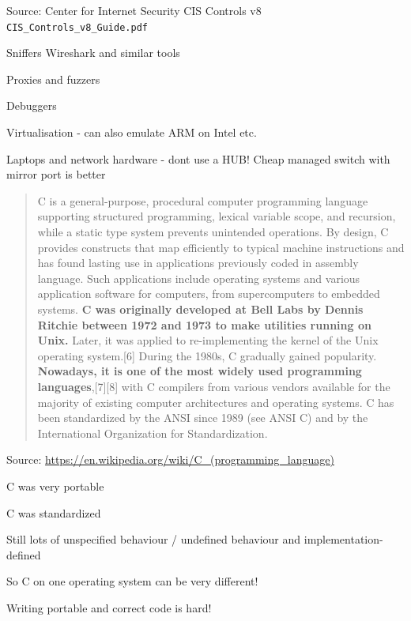\documentclass[Screen16to9,17pt]{foils}
\begin{document}
Source: Center for Internet Security CIS Controls v8 \verb+CIS_Controls_v8_Guide.pdf+






\begin{list2}
\item Sniffers Wireshark and similar tools
\item Proxies and fuzzers
\item Debuggers
\item Virtualisation - can also emulate ARM on Intel etc.
\item Laptops and network hardware - dont use a HUB! Cheap managed switch with mirror port is better
\end{list2}




\begin{quote}
C is a general-purpose, procedural computer programming language supporting structured programming, lexical variable scope, and recursion, while a static type system prevents unintended operations. By design, C provides constructs that map efficiently to typical machine instructions and has found lasting use in applications previously coded in assembly language. Such applications include operating systems and various application software for computers, from supercomputers to embedded systems.
{\bf
C was originally developed at Bell Labs by Dennis Ritchie between 1972 and 1973 to make utilities running on Unix.} Later, it was applied to re-implementing the kernel of the Unix operating system.[6] During the 1980s, C gradually gained popularity. {\bf Nowadays, it is one of the most widely used programming languages},[7][8] with C compilers from various vendors available for the majority of existing computer architectures and operating systems. C has been standardized by the ANSI since 1989 (see ANSI C) and by the International Organization for Standardization.
\end{quote}

Source:
\url{https://en.wikipedia.org/wiki/C_(programming_language)}



\begin{list2}
\item C was very portable
\item C was standardized
\item Still lots of unspecified behaviour / undefined behaviour and implementation-defined
\item So C on one operating system can be very different!
\item Writing portable and correct code is hard!
\end{list2}
\end{document}

